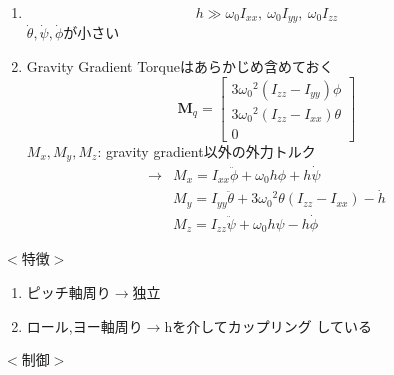 \documentclass[class=article, crop=false, dvipdfmx]{standalone}
\begin{document}
\begin{enumerate}[label=仮定\maru{\theenumi}]
\item
\begin{equation}
h \gg \omega_0 I_{xx}, \ \omega_0 I_{yy}, \ \omega_0 I_{zz}
\end{equation}
$\dot{\theta}, \dot{\psi}, \dot{\phi}$が小さい

\item
Gravity Gradient Torqueはあらかじめ含めておく
\begin{equation}
\bm{M}_q = 
	\begin{bmatrix}
    3 {\omega_0}^2 (I_{zz} - I_{yy}) \phi \\
    3 {\omega_0}^2 (I_{zz} - I_{xx}) \theta \\
    0
    \end{bmatrix}
\end{equation}
$M_x,M_y,M_z$: gravity gradient以外の外力トルク
\begin{align}
\rightarrow
& M_x = I_{xx} \ddot{\phi} + \omega_0 h \phi + h \dot{\psi} \\
& M_y = I_{yy} \ddot{\theta} + 3{\omega_0}^2 \theta (I_{zz} - I_{xx}) - \dot{h} \\
& M_z = I_{zz} \ddot{\psi} + \omega_0 h \psi - h \dot{\phi}
\end{align}
\end{enumerate}
$<$特徴$>$
\begin{enumerate}[label=\theenumi)]
\item ピッチ軸周り$\rightarrow$独立
\item ロール,ヨー軸周り$\rightarrow$hを介してカップリング
している
\end{enumerate}
$<$制御$>$
\end{document}
